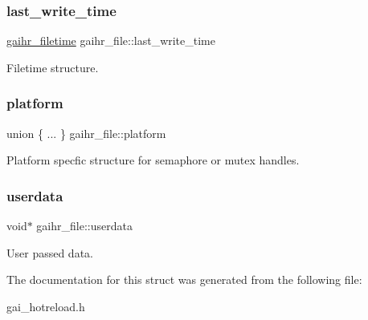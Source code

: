 \subsubsection{\texorpdfstring{last\+\_\+write\+\_\+time}{last\_write\_time}}
{\footnotesize\ttfamily \hyperlink{structgaihr__filetime}{gaihr\+\_\+filetime} gaihr\+\_\+file\+::last\+\_\+write\+\_\+time}

Filetime structure. \mbox{\label{structgaihr__file_a4fa6fa162b2b39b5c54c260271ad6169}} 
\subsubsection{\texorpdfstring{platform}{platform}}
{\footnotesize\ttfamily union \{ ... \}   gaihr\+\_\+file\+::platform}

Platform specfic structure for semaphore or mutex handles. \mbox{\label{structgaihr__file_a06bf963cb9c08e69fcc6c4bb3140a2b8}} 
\subsubsection{\texorpdfstring{userdata}{userdata}}
{\footnotesize\ttfamily void$\ast$ gaihr\+\_\+file\+::userdata}

User passed data. 

The documentation for this struct was generated from the following file\+:\begin{DoxyCompactItemize}
\item 
gai\+\_\+hotreload.\+h\end{DoxyCompactItemize}
